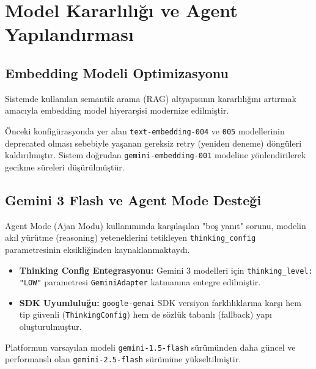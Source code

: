 \documentclass[12pt,a4paper]{article}
\begin{document}
\section{Model Kararlılığı ve Agent Yapılandırması}

\subsection{Embedding Modeli Optimizasyonu}

Sistemde kullanılan semantik arama (RAG) altyapısının kararlılığını artırmak amacıyla embedding model hiyerarşisi modernize edilmiştir.

\begin{warnbox}
Önceki konfigürasyonda yer alan \texttt{text-embedding-004} ve \texttt{005} modellerinin deprecated olması sebebiyle yaşanan gereksiz retry (yeniden deneme) döngüleri kaldırılmıştır. Sistem doğrudan \texttt{gemini-embedding-001} modeline yönlendirilerek gecikme süreleri düşürülmüştür.
\end{warnbox}

\subsection{Gemini 3 Flash ve Agent Mode Desteği}

Agent Mode (Ajan Modu) kullanımında karşılaşılan "boş yanıt" sorunu, modelin akıl yürütme (reasoning) yeteneklerini tetikleyen \texttt{thinking\_config} parametresinin eksikliğinden kaynaklanmaktaydı.

\begin{itemize}[leftmargin=2em]
    \item \textbf{Thinking Config Entegrasyonu:} Gemini 3 modelleri için \texttt{thinking\_level: "LOW"} parametresi \texttt{GeminiAdapter} katmanına entegre edilmiştir.
    \item \textbf{SDK Uyumluluğu:} \texttt{google-genai} SDK versiyon farklılıklarına karşı hem tip güvenli (\texttt{ThinkingConfig}) hem de sözlük tabanlı (fallback) yapı oluşturulmuştur.
\end{itemize}

\begin{notebox}
Platformun varsayılan modeli \texttt{gemini-1.5-flash} sürümünden daha güncel ve performanslı olan \texttt{gemini-2.5-flash} sürümüne yükseltilmiştir.
\end{notebox}
\end{document}
